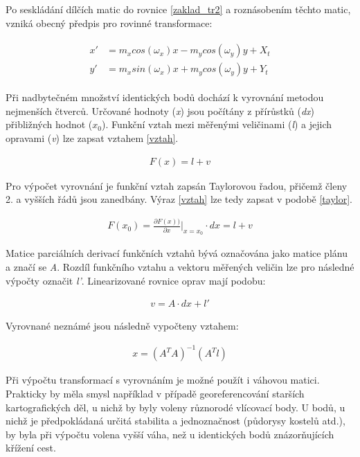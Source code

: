 \documentclass[thesis=M,czech]{FITthesis}[2012/06/26]
\begin{document}
Po seskládání dílčích matic do rovnice \eqref{zaklad_tr2} a roznásobením těchto matic, vzniká obecný předpis pro rovinné transformace:

\begin{align}  \label{obec-transf} 
\begin{split}
x' &= m_x cos(\omega_x) x - m_y cos(\omega_y) y + X_t  \\
y' &= m_x sin(\omega_x) x + m_y cos(\omega_y) y + Y_t 
\end{split}
\end{align}

Při nadbytečném množství identických bodů dochází k vyrovnání metodou nejmenších čtverců. Určované hodnoty (\textit{x}) jsou počítány z přírůstků (\textit{dx}) přibližných hodnot (\textit{$x_0$}). Funkční vztah mezi měřenými veličinami (\textit{l}) a jejich opravami (\textit{v}) lze zapsat vztahem \eqref{vztah}. 

\begin{align}\label{vztah}
F(x) = l + v
\end{align}

Pro výpočet vyrovnání je funkční vztah zapsán Taylorovou řadou, přičemž členy 2. a vyšších řádů jsou zanedbány. Výraz \eqref{vztah} lze tedy zapsat v podobě \eqref{taylor}.

\begin{align}\label{taylor}
F(x_0) = \frac{\partial F(x))}{\partial x} \Bigr\rvert_{x = x_0} \cdot dx = l + v
\end{align}

Matice parciálních derivací funkčních vztahů bývá označována jako matice plánu a značí se \textit{A}. Rozdíl funkčního vztahu a vektoru měřených veličin lze pro následné výpočty označit \textit{l'}. Linearizované rovnice oprav mají podobu:

\begin{align}\label{opravy}
v = A \cdot dx + l'
\end{align}

Vyrovnané neznámé jsou následně vypočteny vztahem:

\begin{align}\label{mnc}
x = (A^TA)^{-1}(A^Tl)
\end{align}

Při výpočtu transformací s vyrovnáním je možné použít i váhovou matici. Prakticky by měla smysl například v případě georeferencování starších kartografických děl, u nichž by byly voleny různorodé vlícovací body. U bodů, u nichž je předpokládaná určitá stabilita a jednoznačnost (půdorysy kostelů atd.), by byla při výpočtu volena vyšší váha, než u identických bodů znázorňujících křížení cest. 
\end{document}
